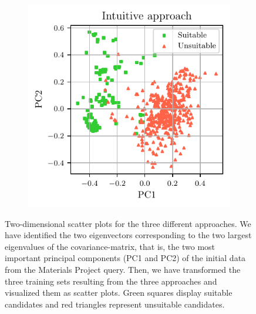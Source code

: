 \documentclass[superscriptaddress,unsortedaddress,
 amsmath,amssymb,
 aps,
]{revtex4-2}
\begin{document}
\begin{figure}[h]
\begin{subfigure}{0.3\textwidth}
    \end{subfigure}
    \begin{subfigure}{0.3\textwidth}
        \centering
        \includegraphics[width=1\textwidth]{figures/pca-2d-plots/03-insightful-approach-v2.pdf}
    \end{subfigure}
    \caption{Two-dimensional scatter plots for the three different approaches. We have identified the two eigenvectors corresponding to the two largest eigenvalues of the covariance-matrix, that is, the two most important principal components (PC1 and PC2) of the initial data from the Materials Project query. Then, we have transformed the three training sets resulting from the three approaches and visualized them as scatter plots. Green squares display suitable candidates and red triangles represent unsuitable candidates.}
    \label{fig:2dscatterplotpca}
\end{figure}
\end{document}
